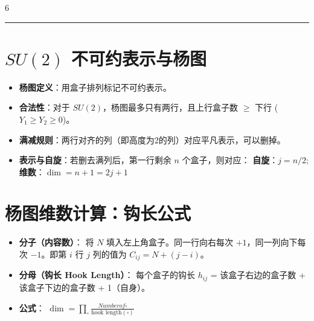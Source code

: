 \documentclass[landscape]{article}
\begin{document}
\begin{multicols*}{6}
\noindent\textcolor{blue}{\rule{\linewidth}{1pt}}
\section*{$SU(2)$ 不可约表示与杨图}
\begin{itemize}
  \item \textbf{杨图定义}：用盒子排列标记不可约表示。
  \item \textbf{合法性}：对于 $SU(2)$，杨图最多只有两行，且上行盒子数 $\ge$ 下行 ($Y_1 \ge Y_2 \ge 0$)。
  \item \textbf{满减规则}：两行对齐的列（即高度为2的列）对应平凡表示，可以删掉。
  \item \textbf{表示与自旋}：若删去满列后，第一行剩余 $n$ 个盒子，则对应：
  \textbf{自旋}：$j = n/2$;\textbf{维数}：$\dim = n+1 = 2j+1$
\end{itemize}
\section*{杨图维数计算：钩长公式}
\begin{itemize}
  \item \textbf{分子（内容数）}：
  将 $N$ 填入左上角盒子。同一行向右每次 $+1$，同一列向下每次 $-1$。即第 $i$ 行 $j$ 列的值为 $C_{ij} = N + (j-i)$。
  \item \textbf{分母（钩长 Hook Length）}：
  每个盒子的钩长 $h_{ij}$ = 该盒子右边的盒子数 + 该盒子下边的盒子数 + 1（自身）。
  \item \textbf{公式}：
  $\dim = \prod_{\square} \frac{Number of \square }{\text{hook length}(\square)}$
\end{itemize}

\end{multicols*}
\end{document}
